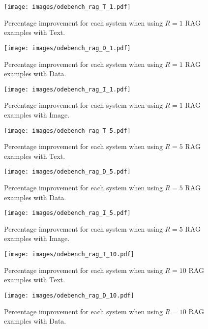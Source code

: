 \documentclass{article}
\begin{document}
\begin{figure}[H]
    \centering
    \texttt{[image: images/odebench\_rag\_T\_1.pdf]}
    \caption{Percentage improvement for each system when using $R=1$ RAG examples with Text.}
    \label{fig:odebench_rag-t-1}
\end{figure}

\begin{figure}[H]
    \centering
    \texttt{[image: images/odebench\_rag\_D\_1.pdf]}
    \caption{Percentage improvement for each system when using $R=1$ RAG examples with Data.}
    \label{fig:odebench_rag-d-1}
\end{figure}

\begin{figure}[H]
    \centering
    \texttt{[image: images/odebench\_rag\_I\_1.pdf]}
    \caption{Percentage improvement for each system when using $R=1$ RAG examples with Image.}
    \label{fig:odebench_rag-i-1}
\end{figure}

\begin{figure}[H]
    \centering
    \texttt{[image: images/odebench\_rag\_T\_5.pdf]}
    \caption{Percentage improvement for each system when using $R=5$ RAG examples with Text.}
    \label{fig:odebench_odebench_rag-t-5}
\end{figure}

\begin{figure}[H]
    \centering
    \texttt{[image: images/odebench\_rag\_D\_5.pdf]}
    \caption{Percentage improvement for each system when using $R=5$ RAG examples with Data.}
    \label{fig:odebench_rag-d-5}
\end{figure}

\begin{figure}[H]
    \centering
    \texttt{[image: images/odebench\_rag\_I\_5.pdf]}
    \caption{Percentage improvement for each system when using $R=5$ RAG examples with Image.}
    \label{fig:odebench_rag-i-5}
\end{figure}

\begin{figure}[H]
    \centering
    \texttt{[image: images/odebench\_rag\_T\_10.pdf]}
    \caption{Percentage improvement for each system when using $R=10$ RAG examples with Text.}
    \label{fig:odebench_rag-t-10}
\end{figure}

\begin{figure}[H]
    \centering
    \texttt{[image: images/odebench\_rag\_D\_10.pdf]}
    \caption{Percentage improvement for each system when using $R=10$ RAG examples with Data.}
    \label{fig:odebench_rag-d-10}
\end{figure}
\end{document}
